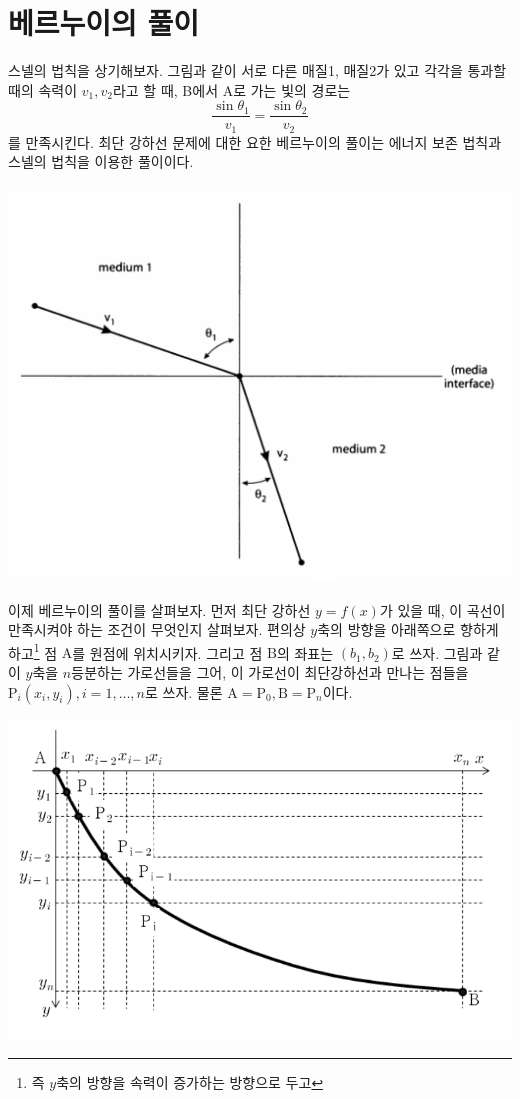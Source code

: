 \section{베르누이의 풀이}

스넬의 법칙을 상기해보자. 그림과 같이 서로 다른 매질1, 매질2가 있고 각각을 통과할 때의 속력이 $v_1, v_2$라고 할 때, B에서 A로 가는 빛의 경로는 
\[
\frac{\sin\theta_1}{v_1}=\frac{\sin\theta_2}{v_2}
\]
를 만족시킨다. 최단 강하선 문제에 대한 요한 베르누이의 풀이는 에너지 보존 법칙과 스넬의 법칙을 이용한 풀이이다.

\begin{center}
\includegraphics[width=.8\textwidth]{images/snellslaw}
\end{center}

이제 베르누이의 풀이를 살펴보자. 먼저 최단 강하선 $y=f(x)$가 있을 때, 이 곡선이 만족시켜야 하는 조건이 무엇인지 살펴보자. 편의상 $y$축의 방향을 아래쪽으로 향하게 하고\footnote{즉 $y$축의 방향을 속력이 증가하는 방향으로 두고} 점 $\mathrm{A}$를 원점에 위치시키자. 그리고 점 $\mathrm{B}$의 좌표는 $(b_1, b_2)$로 쓰자.  그림과 같이 $y$축을 $n$등분하는 가로선들을 그어, 이 가로선이 최단강하선과 만나는 점들을 $\mathrm{P}_i(x_i, y_i), i=1,\ldots, n$로 쓰자.   물론 $\mathrm{A}=\mathrm{P}_0, \mathrm{B}=\mathrm{P}_n$이다.

\begin{center}
\includegraphics[width=.9\textwidth]{images/bernsol01}
\end{center}

